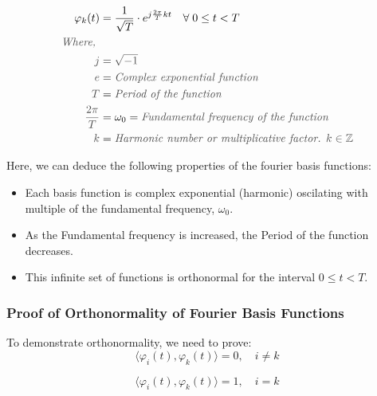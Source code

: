 \documentclass[letterpaper,12pt]{article}
\newcommand{\annot}[1]{\textcolor{darkgray}{\textit{#1}}}
\begin{document}
\begin{align*}
    \varphi_{k}(t)            & = \frac{1}{\sqrt{T}}\cdot e^{j\frac{2\pi}{T}k t} \quad \forall \; 0 \leq t < T \\
    \annot{Where, }                                                                                            \\
    \annot{$j$}               & = \annot{$\sqrt{-1}$}                                                          \\
    \annot{$e$}               & = \annot{Complex exponential function}                                         \\
    \annot{$T$}               & = \annot{Period of the function}
    \\
    \annot{$\frac{2 \pi}{T}$} & = \omega_{0} = \annot{Fundamental frequency of the function}
    \\
    \annot{$k$}               & = \annot{Harmonic number or multiplicative factor. $k \in\mathbb{Z}$}
\end{align*}

Here, we can deduce the following properties of the fourier basis functions:

\begin{itemize}
    \item Each basis function is complex exponential (harmonic) oscilating with multiple of the fundamental frequency, $\omega_{0}$.
    \item As the Fundamental frequency is increased, the Period of the function decreases.
    \item This infinite set of functions is orthonormal for the interval $0 \leq t < T$.
\end{itemize}

\subsubsection*{Proof of Orthonormality of Fourier Basis Functions}
To demonstrate orthonormality, we need to prove:
\[\langle \varphi_{i}(t), \varphi_{k}(t) \rangle = 0, \quad i\neq k \]

\[\langle \varphi_{i}(t), \varphi_{k}(t) \rangle = 1, \quad i = k \]
\end{document}

